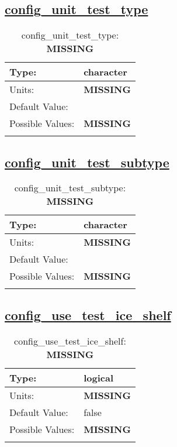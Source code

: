 \subsection[config\_unit\_test\_type]{\hyperref[sec:nm_tab_unit_test]{config\_unit\_test\_type}}
\label{subsec:nm_sec_config_unit_test_type}
\begin{center}
\begin{longtable}{| p{2.0in} || p{4.0in} |}
    \hline
    Type: & character \\
    \hline
    Units: & {\bf \color{red} MISSING} \\
    \hline
    Default Value: &  \\
    \hline
    Possible Values: & {\bf \color{red} MISSING} \\
    \hline
    \caption{config\_unit\_test\_type: {\bf \color{red} MISSING}}
\end{longtable}
\end{center}
\subsection[config\_unit\_test\_subtype]{\hyperref[sec:nm_tab_unit_test]{config\_unit\_test\_subtype}}
\label{subsec:nm_sec_config_unit_test_subtype}
\begin{center}
\begin{longtable}{| p{2.0in} || p{4.0in} |}
    \hline
    Type: & character \\
    \hline
    Units: & {\bf \color{red} MISSING} \\
    \hline
    Default Value: &  \\
    \hline
    Possible Values: & {\bf \color{red} MISSING} \\
    \hline
    \caption{config\_unit\_test\_subtype: {\bf \color{red} MISSING}}
\end{longtable}
\end{center}
\subsection[config\_use\_test\_ice\_shelf]{\hyperref[sec:nm_tab_unit_test]{config\_use\_test\_ice\_shelf}}
\label{subsec:nm_sec_config_use_test_ice_shelf}
\begin{center}
\begin{longtable}{| p{2.0in} || p{4.0in} |}
    \hline
    Type: & logical \\
    \hline
    Units: & {\bf \color{red} MISSING} \\
    \hline
    Default Value: & false \\
    \hline
    Possible Values: & {\bf \color{red} MISSING} \\
    \hline
    \caption{config\_use\_test\_ice\_shelf: {\bf \color{red} MISSING}}
\end{longtable}
\end{center}
